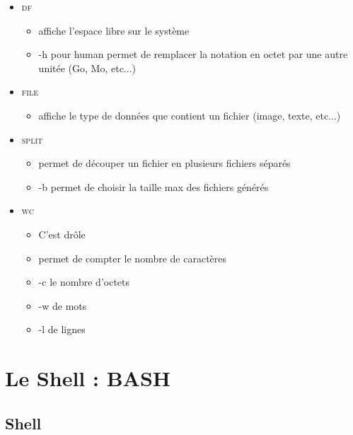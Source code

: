 \documentclass[a4paper]{article}
\begin{document}
\begin{itemize}[label=\textbullet, font=\large]
\begin{itemize}[label=, font=\scriptsize]
      \end{itemize}
      \item \textsc{df}
      \begin{itemize}[label=, font=\scriptsize]
        \item affiche l'espace libre sur le système
        \item -h pour human permet de remplacer la notation en octet par une autre unitée (Go, Mo, etc...)
      \end{itemize}
      \item \textsc{file}
      \begin{itemize}[label=, font=\scriptsize]
        \item affiche le type de données que contient un fichier (image, texte, etc...)
      \end{itemize}
      \item \textsc{split}
      \begin{itemize}[label=, font=\scriptsize]
        \item permet de découper un fichier en plusieurs fichiers séparés
        \item -b permet de choisir la taille max des fichiers générés
      \end{itemize}
      \item \textsc{wc}
      \begin{itemize}[label=, font=\scriptsize]
        \item C'est drôle
        \item permet de compter le nombre de caractères
        \item -c le nombre d'octets
        \item -w de mots
        \item -l de lignes
      \end{itemize}
    \end{itemize}
    \section{Le Shell : BASH}
      \subsection{Shell}
\end{document}
